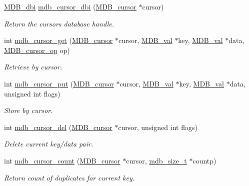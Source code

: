 \begin{DoxyCompactItemize}
\mbox{\hyperlink{group__mdb_gadbe68a06c448dfb62da16443d251a78b}{M\+D\+B\+\_\+dbi}} \mbox{\hyperlink{group__mdb_ga2f7092cf70ee816fb3d2c3267a732372}{mdb\+\_\+cursor\+\_\+dbi}} (\mbox{\hyperlink{struct_m_d_b__cursor}{M\+D\+B\+\_\+cursor}} $\ast$cursor)
\begin{DoxyCompactList}\small\item\em Return the cursor\textquotesingle{}s database handle. \end{DoxyCompactList}\item 
int \mbox{\hyperlink{group__mdb_ga48df35fb102536b32dfbb801a47b4cb0}{mdb\+\_\+cursor\+\_\+get}} (\mbox{\hyperlink{struct_m_d_b__cursor}{M\+D\+B\+\_\+cursor}} $\ast$cursor, \mbox{\hyperlink{struct_m_d_b__val}{M\+D\+B\+\_\+val}} $\ast$key, \mbox{\hyperlink{struct_m_d_b__val}{M\+D\+B\+\_\+val}} $\ast$data, \mbox{\hyperlink{group__mdb_ga1206b2af8b95e7f6b0ef6b28708c9127}{M\+D\+B\+\_\+cursor\+\_\+op}} op)
\begin{DoxyCompactList}\small\item\em Retrieve by cursor. \end{DoxyCompactList}\item 
int \mbox{\hyperlink{group__mdb_ga1f83ccb40011837ff37cc32be01ad91e}{mdb\+\_\+cursor\+\_\+put}} (\mbox{\hyperlink{struct_m_d_b__cursor}{M\+D\+B\+\_\+cursor}} $\ast$cursor, \mbox{\hyperlink{struct_m_d_b__val}{M\+D\+B\+\_\+val}} $\ast$key, \mbox{\hyperlink{struct_m_d_b__val}{M\+D\+B\+\_\+val}} $\ast$data, unsigned int flags)
\begin{DoxyCompactList}\small\item\em Store by cursor. \end{DoxyCompactList}\item 
int \mbox{\hyperlink{group__mdb_ga26a52d3efcfd72e5bf6bd6960bf75f95}{mdb\+\_\+cursor\+\_\+del}} (\mbox{\hyperlink{struct_m_d_b__cursor}{M\+D\+B\+\_\+cursor}} $\ast$cursor, unsigned int flags)
\begin{DoxyCompactList}\small\item\em Delete current key/data pair. \end{DoxyCompactList}\item 
int \mbox{\hyperlink{group__mdb_ga182be40c73eae62dba8751477e5c0e26}{mdb\+\_\+cursor\+\_\+count}} (\mbox{\hyperlink{struct_m_d_b__cursor}{M\+D\+B\+\_\+cursor}} $\ast$cursor, \mbox{\hyperlink{lmdb_8h_a78821971e612e3898ef4b3ae45ed86f1}{mdb\+\_\+size\+\_\+t}} $\ast$countp)
\begin{DoxyCompactList}\small\item\em Return count of duplicates for current key. \end{DoxyCompactList}\item 

\end{DoxyCompactItemize}
